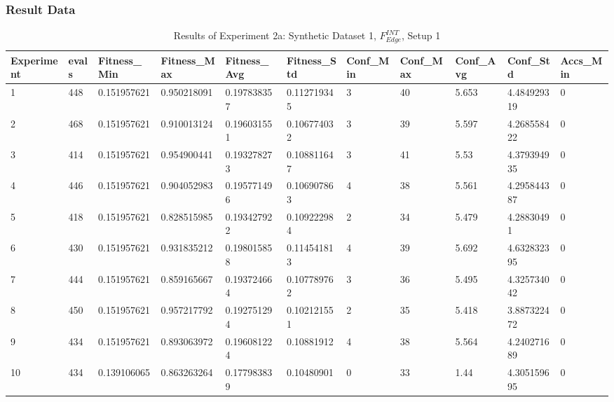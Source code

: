 		\subsubsection{Result Data}
		\label{sec:A_Exp2b_Data}
			\begin{table}[H]
				\caption{Results of Experiment 2a: Synthetic Dataset 1, $F_{Edge}^{INT}$, Setup 1}
				\label{tab:A_Exp2b_Data}
				\begin{adjustbox}{max width=380pt,keepaspectratio,angle=90}
					\begin{tabular}{|l|l|l|l|l|l|l|l|l|l|l|}
						\rowcolor[HTML]{EFEFEF} 
						\hline
						Experiment & evals & Fitness\_Min & Fitness\_Max & Fitness\_Avg & Fitness\_Std & Conf\_Min & Conf\_Max & Conf\_Avg & Conf\_Std   & Accs\_Min \\ \hline
						1          & 448   & 0.151957621  & 0.950218091  & 0.197838357  & 0.112719345  & 3         & 40        & 5.653     & 4.484929319 & 0         \\ \hline
						2          & 468   & 0.151957621  & 0.910013124  & 0.196031551  & 0.106774032  & 3         & 39        & 5.597     & 4.268558422 & 0         \\ \hline
						3          & 414   & 0.151957621  & 0.954900441  & 0.193278273  & 0.108811647  & 3         & 41        & 5.53      & 4.379394935 & 0         \\ \hline
						4          & 446   & 0.151957621  & 0.904052983  & 0.195771496  & 0.106907863  & 4         & 38        & 5.561     & 4.295844387 & 0         \\ \hline
						5          & 418   & 0.151957621  & 0.828515985  & 0.193427922  & 0.109222984  & 2         & 34        & 5.479     & 4.28830491  & 0         \\ \hline
						6          & 430   & 0.151957621  & 0.931835212  & 0.198015858  & 0.114541813  & 4         & 39        & 5.692     & 4.632832395 & 0         \\ \hline
						7          & 444   & 0.151957621  & 0.859165667  & 0.193724664  & 0.107789762  & 3         & 36        & 5.495     & 4.325734042 & 0         \\ \hline
						8          & 450   & 0.151957621  & 0.957217792  & 0.192751294  & 0.102121551  & 2         & 35        & 5.418     & 3.887322472 & 0         \\ \hline
						9          & 434   & 0.151957621  & 0.893063972  & 0.196081224  & 0.10881912   & 4         & 38        & 5.564     & 4.240271689 & 0         \\ \hline
						10         & 434   & 0.139106065  & 0.863263264  & 0.177983839  & 0.10480901   & 0         & 33        & 1.44      & 4.305159695 & 0         \\ \hline\hline

\end{tabular}
\end{adjustbox}
\end{table}
